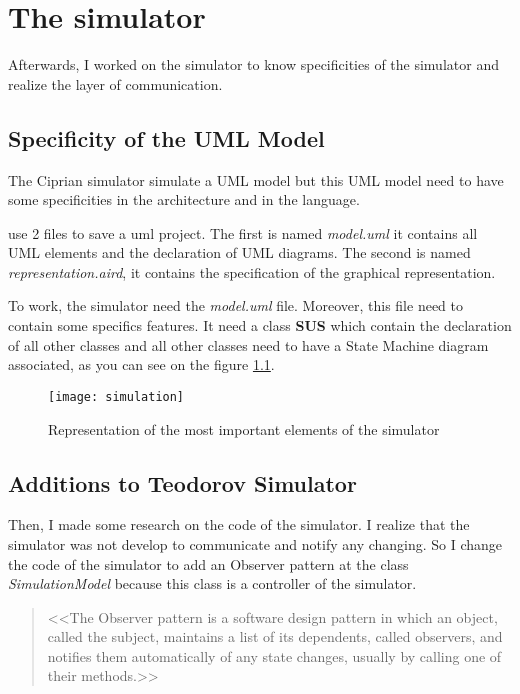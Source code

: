 
\chapter{The simulator}
\label{chap:simul}

Afterwards, I worked on the simulator to know specificities of the simulator and realize the layer of communication.

\section{Specificity of the UML Model}

The Ciprian simulator simulate a UML model but this UML model need to have some specificities in the architecture and in the language.

\umld use 2 files to save a uml project. The first is named \textit{model.uml} it contains all UML elements and the declaration of UML diagrams. The second is named \textit{representation.aird}, it contains the specification of the graphical representation.

To work, the simulator need the \textit{model.uml} file. Moreover, this file need to contain some specifics features. It need a class \textbf{SUS} which contain the declaration of all other classes and all other classes need to have a State Machine diagram associated, as you can see on the figure \ref{fig:simulateur}.

\begin{figure}[h!]
  \centering
  \texttt{[image: simulation]}
  \caption{Representation of the most important elements of the simulator}
  \label{fig:simulateur}
\end{figure}

\section{Additions to Teodorov Simulator}

Then, I made some research on the code of the simulator. I realize that the simulator was not develop to communicate and notify any changing. So I change the code of the simulator to add an Observer pattern at the class \textit{SimulationModel} because this class is a controller of the simulator.

\begin{quotation}
<<The Observer pattern is a software design pattern in which an object, called the subject, maintains a list of its dependents, called observers, and notifies them automatically of any state changes, usually by calling one of their methods.>> \cite{wiki_pattern}
\end{quotation}


